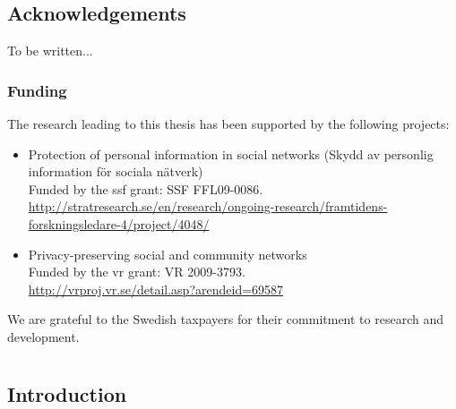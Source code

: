 \documentclass[showtrims,oldfontcommands]{kthesis}
\begin{document}
\begin{abstract}
    Our solutions are some concrete examples of how privacy as data control, as 
    envisioned by Anita Allen, can be achieved in different degrees and scenarios 
    within centralised and decentralised \aclp*{is}. Nonetheless, we hope that the 
    privacy-preserving protocols we propose can be useful in other scenarios to 
    mitigate the diverse dangers to personal privacy that we are facing nowadays.
    
\end{abstract}
\clearpage

\chapter*{Acknowledgements}
To be written...

\section*{Funding}
The research leading to this thesis has been supported by the following projects:
\begin{itemize}
    \item Protection of personal information in social networks (Skydd av personlig information f{\"o}r sociala n{\"a}tverk)\\
    Funded by the \ac{ssf} grant: SSF FFL09-0086.\\
    \url{http://stratresearch.se/en/research/ongoing-research/framtidens-forskningsledare-4/project/4048/}
    \item Privacy-preserving social and community networks\\
    Funded by the \ac{vr} grant: VR 2009-3793.\\
    \url{http://vrproj.vr.se/detail.asp?arendeid=69587}
\end{itemize}

We are grateful to the Swedish taxpayers for their commitment to research and development.

\clearpage

\tableofcontents

\mainmatter

\part*{}

\chapter{Introduction}
    \label{chapter:introduction}
\end{document}
